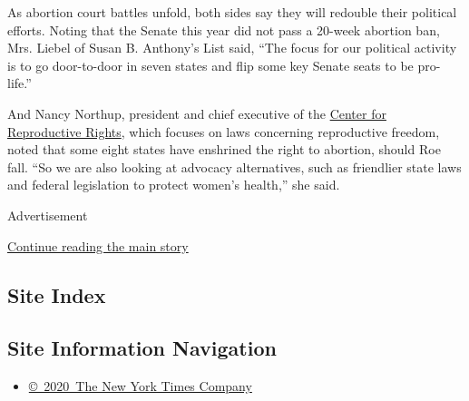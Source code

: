 As abortion court battles unfold, both sides say they will redouble
their political efforts. Noting that the Senate this year did not pass a
20-week abortion ban, Mrs. Liebel of Susan B. Anthony's List said, ``The
focus for our political activity is to go door-to-door in seven states
and flip some key Senate seats to be pro-life.''

And Nancy Northup, president and chief executive of the
\href{https://www.reproductiverights.org/}{Center for Reproductive
Rights}, which focuses on laws concerning reproductive freedom, noted
that some eight states have enshrined the right to abortion, should Roe
fall. ``So we are also looking at advocacy alternatives, such as
friendlier state laws and federal legislation to protect women's
health,'' she said.

Advertisement

\protect\hyperlink{after-bottom}{Continue reading the main story}

\hypertarget{site-index}{%
\subsection{Site Index}\label{site-index}}

\hypertarget{site-information-navigation}{%
\subsection{Site Information
Navigation}\label{site-information-navigation}}

\begin{itemize}
\tightlist
\item
  \href{https://help.nytimes3xbfgragh.onion/hc/en-us/articles/115014792127-Copyright-notice}{©~2020~The
  New York Times Company}
\end{itemize}

